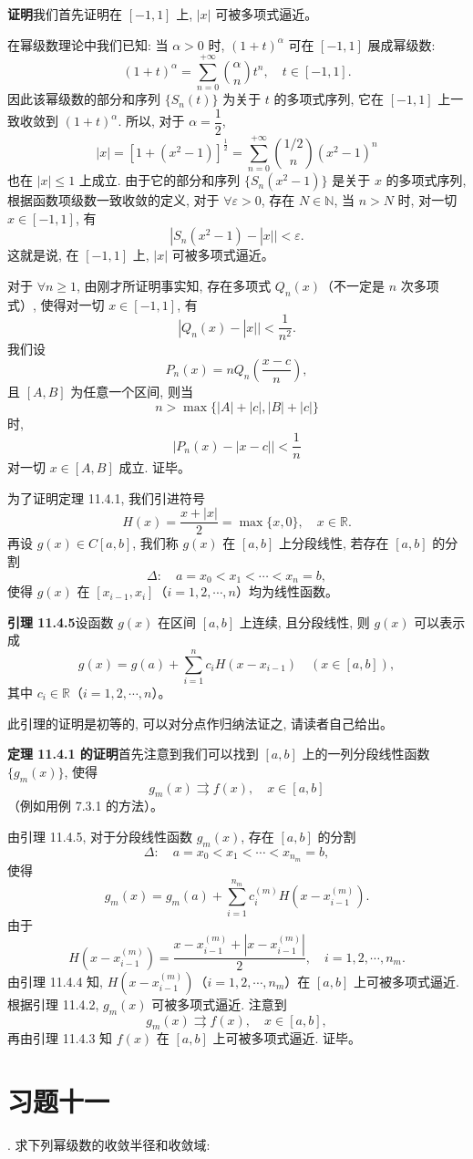 \documentclass[UTF8,12pt,a4paper,fontset=fandol]{ctexart}
\begin{document}
\noindent\textbf{证明}\quad 我们首先证明在 $[-1,1]$ 上, $|x|$ 可被多项式逼近。

在幂级数理论中我们已知: 当 $\alpha>0$ 时, $(1+t)^\alpha$ 可在 $[-1,1]$ 展成幂级数:
\[
  (1+t)^\alpha=\sum_{n=0}^{+\infty}\binom{\alpha}{n}t^n,
  \quad t\in[-1,1].
\]
因此该幂级数的部分和序列 $\{S_n(t)\}$ 为关于 $t$ 的多项式序列, 它在 $[-1,1]$ 上一致收敛到 $(1+t)^\alpha$. 所以, 对于 $\alpha=\dfrac12$,
\[
  |x|
  =
  [1+(x^2-1)]^{\frac12}
  =
  \sum_{n=0}^{+\infty}\binom{1/2}{n}(x^2-1)^n
\]
也在 $|x|\leqslant1$ 上成立. 由于它的部分和序列 $\{S_n(x^2-1)\}$ 是关于 $x$ 的多项式序列, 根据函数项级数一致收敛的定义, 对于 $\forall\varepsilon>0$, 存在 $N\in\mathbb N$, 当 $n>N$ 时, 对一切 $x\in[-1,1]$, 有
\[
  |S_n(x^2-1)-|x||<\varepsilon.
\]
这就是说, 在 $[-1,1]$ 上, $|x|$ 可被多项式逼近。

对于 $\forall n\geqslant1$, 由刚才所证明事实知, 存在多项式 $Q_n(x)$（不一定是 $n$ 次多项式）, 使得对一切 $x\in[-1,1]$, 有
\[
  |Q_n(x)-|x||<\frac1{n^2}.
\]
我们设
\[
  P_n(x)=nQ_n\left(\frac{x-c}{n}\right),
\]
且 $[A,B]$ 为任意一个区间, 则当
\[
  n>\max\{|A|+|c|,|B|+|c|\}
\]
时,
\[
  |P_n(x)-|x-c||<\frac1n
\]
对一切 $x\in[A,B]$ 成立. 证毕。

为了证明定理 11.4.1, 我们引进符号
\[
  H(x)=\frac{x+|x|}{2}=\max\{x,0\},\quad x\in\mathbb R.
\]
再设 $g(x)\in C[a,b]$, 我们称 $g(x)$ 在 $[a,b]$ 上分段线性, 若存在 $[a,b]$ 的分割
\[
  \Delta:\quad a=x_0<x_1<\cdots<x_n=b,
\]
使得 $g(x)$ 在 $[x_{i-1},x_i]$（$i=1,2,\cdots,n$）均为线性函数。

\noindent\textbf{引理 11.4.5}\quad 设函数 $g(x)$ 在区间 $[a,b]$ 上连续, 且分段线性, 则 $g(x)$ 可以表示成
\[
  g(x)=g(a)+\sum_{i=1}^{n}c_iH(x-x_{i-1})
  \quad(x\in[a,b]),
\]
其中 $c_i\in\mathbb R$（$i=1,2,\cdots,n$）。

此引理的证明是初等的, 可以对分点作归纳法证之, 请读者自己给出。

\noindent\textbf{定理 11.4.1 的证明}\quad 首先注意到我们可以找到 $[a,b]$ 上的一列分段线性函数 $\{g_m(x)\}$, 使得
\[
  g_m(x)\rightrightarrows f(x),\quad x\in[a,b]
\]
（例如用例 7.3.1 的方法）。

由引理 11.4.5, 对于分段线性函数 $g_m(x)$, 存在 $[a,b]$ 的分割
\[
  \Delta:\quad a=x_0<x_1<\cdots<x_{n_m}=b,
\]
使得
\[
  g_m(x)=g_m(a)+\sum_{i=1}^{n_m}c_i^{(m)}H(x-x_{i-1}^{(m)}).
\]
由于
\[
  H(x-x_{i-1}^{(m)})
  =
  \frac{x-x_{i-1}^{(m)}+|x-x_{i-1}^{(m)}|}{2},
  \quad i=1,2,\cdots,n_m.
\]
由引理 11.4.4 知, $H(x-x_{i-1}^{(m)})$（$i=1,2,\cdots,n_m$）在 $[a,b]$ 上可被多项式逼近. 根据引理 11.4.2, $g_m(x)$ 可被多项式逼近. 注意到
\[
  g_m(x)\rightrightarrows f(x),\quad x\in[a,b],
\]
再由引理 11.4.3 知 $f(x)$ 在 $[a,b]$ 上可被多项式逼近. 证毕。

\section*{习题十一}

. 求下列幂级数的收敛半径和收敛域:
\end{document}

